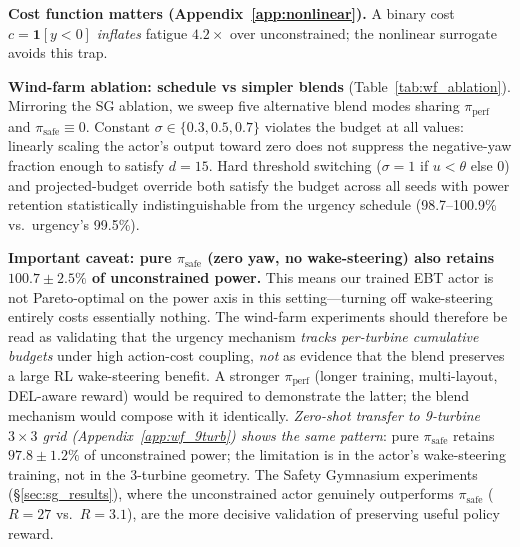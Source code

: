 \textbf{Cost function matters (Appendix~\ref{app:nonlinear}).}
A binary cost $c\!=\!\mathbf{1}[y\!<\!0]$ \emph{inflates} fatigue $4.2\times$ over unconstrained; the nonlinear surrogate avoids this trap.

\textbf{Wind-farm ablation: schedule vs simpler blends} (Table~\ref{tab:wf_ablation}).
Mirroring the SG ablation, we sweep five alternative blend modes sharing $\pi_{\mathrm{perf}}$ and $\pi_{\mathrm{safe}}\!\equiv\!0$.
Constant $\sigma\!\in\!\{0.3, 0.5, 0.7\}$ violates the budget at all values: linearly scaling the actor's output toward zero does not suppress the negative-yaw fraction enough to satisfy $d\!=\!15$.
Hard threshold switching ($\sigma\!=\!1$ if $u\!<\!\theta$ else $0$) and projected-budget override both satisfy the budget across all seeds with power retention statistically indistinguishable from the urgency schedule (98.7--100.9\% vs.\ urgency's 99.5\%).

\textbf{Important caveat: pure $\pi_{\mathrm{safe}}$ (zero yaw, no wake-steering) also retains $100.7\!\pm\!2.5\%$ of unconstrained power.}
This means our trained EBT actor is not Pareto-optimal on the power axis in this setting---turning off wake-steering entirely costs essentially nothing.
The wind-farm experiments should therefore be read as validating that the urgency mechanism \emph{tracks per-turbine cumulative budgets} under high action-cost coupling, \emph{not} as evidence that the blend preserves a large RL wake-steering benefit.
A stronger $\pi_{\mathrm{perf}}$ (longer training, multi-layout, DEL-aware reward) would be required to demonstrate the latter; the blend mechanism would compose with it identically.
\emph{Zero-shot transfer to 9-turbine $3\!\times\!3$ grid (Appendix~\ref{app:wf_9turb}) shows the same pattern}: pure $\pi_{\mathrm{safe}}$ retains $97.8\!\pm\!1.2\%$ of unconstrained power; the limitation is in the actor's wake-steering training, not in the 3-turbine geometry.
The Safety Gymnasium experiments (\S\ref{sec:sg_results}), where the unconstrained actor genuinely outperforms $\pi_{\mathrm{safe}}$ ($R\!=\!27$ vs.\ $R\!=\!3.1$), are the more decisive validation of preserving useful policy reward.

